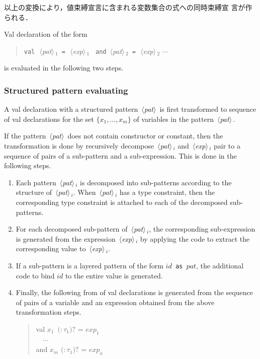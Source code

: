 \documentclass{jbook}
\newcommand{\nonterm}[1]{\mbox{$\,\langle$}{\it #1}\mbox{$\rangle\,$}}
\newcommand{\term}[1]{\mbox{{\tt #1}}}
\newcommand{\optional}[1]{\mbox{$($}{\protect #1}\mbox{$)?$}}
\newcommand{\myem}{\mbox{\ \ }}
\newenvironment{program}{\begin{quote}\begin{tt}}%
                        {\end{tt}\end{quote}}
\begin{document}
	以上の変換により，値束縛宣言に含まれる変数集合の式への同時束縛宣
言が作られる．

\else%
	Val declaration of the form
\begin{program}
\term{val}\ \nonterm{pat}$_1$\ \term{=}\ \nonterm{exp}$_1$ \ \term{and} \nonterm{pat}$_2$\ \term{=}\ \nonterm{exp}$_2$ $\cdots$
\end{program}
is evaluated in the following two steps.

\subsubsection{Structured pattern evaluating}

	A val declaration with a structured pattern \nonterm{pat} is
first transformed to sequence of val declarations for the set 
$\{x_1,\ldots,x_m\}$ of variables in the pattern \nonterm{pat}.
	
	If the pattern \nonterm{pat} does not contain constructor or
constant, then the transformation is done by recursively decompose 
\nonterm{pat}$_i$ and \nonterm{exp}$_i$ pair to a sequence of pairs of a
sub-pattern and a sub-expression.
	This is done in the following steps.
\begin{enumerate}
\item 
	Each pattern \nonterm{pat}$_i$ is decomposed into sub-patterns
according to the structure of \nonterm{pat}$_i$.
	When \nonterm{pat}$_i$ has a type constraint, then the
corresponding type constraint is attached to each of the decomposed
sub-patterns.

\item 
	For each decomposed sub-pattern of \nonterm{pat}$_i$,
the corresponding sub-expression is generated from the expression
\nonterm{exp}$_i$ by applying the code to extract the corresponding
value to \nonterm{exp}$_i$. 

\item 
	If a sub-pattern is a layered pattern of the form
{\tt $id$ as $pat$}, the additional code to bind $id$ to the entire
value is generated.

\item 
	Finally, the following from of val declarations is generated
from the sequence of pairs of a variable and an expression obtained from
the above transformation steps.
\begin{program}
  val $x_1$\ \optional{$:\tau_1$} = $exp_1$\\
  \myem $\cdots$\\
  and $x_m$ \optional{$:\tau_1$} = $exp_n$
\end{program}
\end{enumerate}
\end{document}
